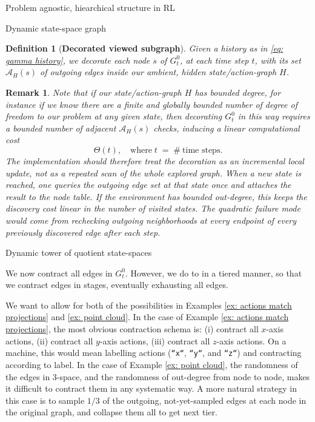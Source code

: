 \documentclass[11pt]{article}
\newtheorem{definition}[subsubsection]{Definition}
\newtheorem{remark}[subsubsection]{Remark}
\begin{document}
\begin{section}{Problem agnostic, hiearchical structure in RL}
\begin{subsection}{Dynamic state-space graph}
\begin{definition}[{\bf Decorated viewed subgraph}]
\normalfont
Given a history as in \eqref{eq: gamma history}, we decorate each node $s$ of $G^{0}_{t}$, at each time step $t$, with its set $\mathcal{A}_{H}(s)$ of outgoing edges  {\em inside} our ambient, hidden state/action-graph $H$.
\end{definition}

\begin{remark}
\normalfont
Note that if our state/action-graph $H$ has bounded degree, for instance if we know there are a finite and globally bounded number of degree of freedom to our problem at any given state, then decorating $G^{0}_{t}$ in this way requires a bounded number of adjacent $\mathcal{A}_{H}(s)$ checks, inducing a linear computational cost
$$
\Theta(t),\quad\text{where}\;t\;=\;\#\ \text{time steps}.
$$
The implementation should therefore treat the decoration as an incremental local update, not as a repeated scan of the whole explored graph. When a new state is reached, one queries the outgoing edge set at that state once and attaches the result to the node table. If the environment has bounded out-degree, this keeps the discovery cost linear in the number of visited states. The quadratic failure mode would come from rechecking outgoing neighborhoods at every endpoint of every previously discovered edge after each step.
\end{remark}



\end{subsection}

\begin{subsection}{Dynamic tower of quotient state-spaces}

We now contract all edges in $G^{0}_{t}$. However, we do to in a tiered manner, so that we contract edges in stages, eventually exhausting all edges. 

We want to allow for both of the possibilities in Examples \ref{ex: actions match projections} and \ref{ex: point cloud}. In the case of Example \ref{ex: actions match projections}, the most obvious contraction schema is: (i) contract all $x$-axis actions, (ii) contract all $y$-axis actions, (iii) contract all $z$-axis actions. On a machine, this would mean labelling actions (\texttt{``x``}, \texttt{``y``}, and \texttt{``z``}) and contracting according to label. In the case of Example \ref{ex: point cloud}, the randomness of the edges in $3$-space, and the randomness of out-degree from node to node, makes it difficult to contract them in any systematic way. A more natural strategy in this case is to sample $1/3$ of the outgoing, not-yet-sampled edges at each node in the original graph, and collapse them all to get next tier.


\end{subsection}
\end{section}
\end{document}
